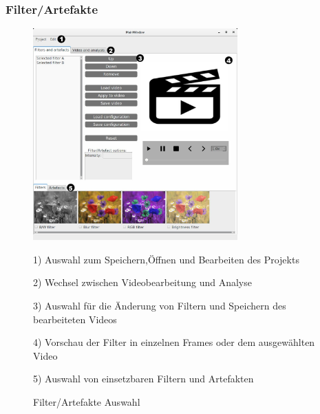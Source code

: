 \documentclass[parskip=full]{scrartcl}
\begin{document}
\subsubsection{Filter/Artefakte}
\begin{figure}[htbp] 
\centering
\includegraphics[width=0.7\textwidth]{ToViET/Screenshots/GUI_Filterselection.jpg}
\caption{Filter/Artefakte Auswahl}
\begin{flushleft}
\item 1) Auswahl zum Speichern,Öffnen und Bearbeiten des Projekts
\item 2) Wechsel zwischen Videobearbeitung und Analyse
\item 3) Auswahl für die Änderung von Filtern und Speichern des bearbeiteten Videos
\item 4) Vorschau der Filter in einzelnen Frames oder dem ausgewählten Video
\item 5) Auswahl von einsetzbaren Filtern und Artefakten
\end{flushleft}
\end{figure}
\newpage
\end{document}
